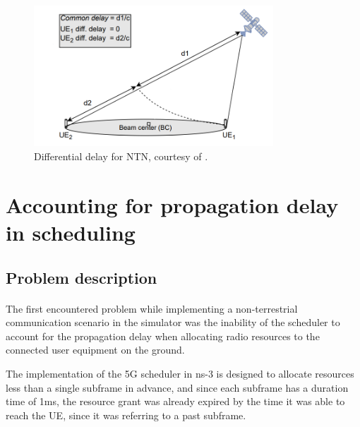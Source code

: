 \begin{figure}[ht]
    \centering
    \includegraphics[width=0.8\textwidth]{res/diff-delay.png}
    \caption{Differential delay for \ac{NTN}, courtesy of \cite{preamble-detection-chougrani}.}
    \label{fig:diff-delay}
\end{figure}


\section{Accounting for propagation delay in scheduling}
\label{sec:pd-sched-acc}

\subsection{Problem description}
\label{ss:propdelay-problem-desc}
\paragraph{}
The first encountered problem while implementing a non-terrestrial communication scenario in the simulator was the inability of the scheduler to account for the propagation delay when allocating radio resources to the connected user equipment on the ground.

The implementation of the 5G scheduler in ns-3 is designed to allocate resources less than a single subframe in advance, and since each subframe has a duration time of 1ms, the resource grant was already expired by the time it was able to reach the \ac{UE}, since it was referring to a past subframe.

